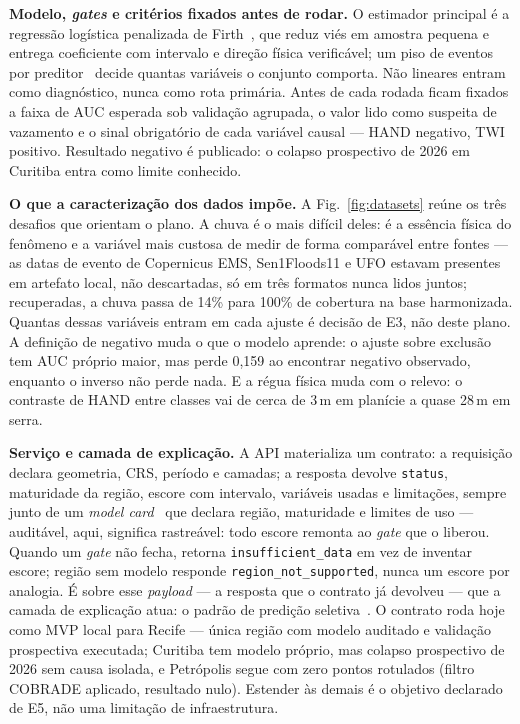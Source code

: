 \documentclass[conference]{IEEEtran}
\begin{document}
\textbf{Modelo, \emph{gates} e critérios fixados antes de rodar.} O estimador
principal é a regressão logística penalizada de Firth~\cite{firth1993}, que reduz
viés em amostra pequena e entrega coeficiente com intervalo e direção física
verificável; um piso de eventos por preditor~\cite{peduzzi1996} decide quantas
variáveis o conjunto comporta. Não lineares entram como diagnóstico, nunca como
rota primária. Antes de cada rodada ficam fixados a faixa de AUC esperada sob
validação agrupada, o valor lido como suspeita de vazamento e o sinal obrigatório
de cada variável causal --- HAND negativo, TWI positivo. Resultado negativo é
publicado: o colapso prospectivo de 2026 em Curitiba entra como limite
conhecido.

\textbf{O que a caracterização dos dados impõe.} A Fig.~\ref{fig:datasets} reúne
os três desafios que orientam o plano. A chuva é o mais difícil deles: é a
essência física do fenômeno e a variável mais custosa de medir de forma
comparável entre fontes --- as datas de evento de Copernicus EMS,
Sen1Floods11 e UFO estavam presentes em artefato local, não descartadas, só
em três formatos nunca lidos juntos; recuperadas, a chuva passa de 14\% para
100\% de cobertura na base harmonizada. Quantas dessas variáveis entram em
cada ajuste é decisão de E3, não deste plano. A definição de negativo muda o
que o modelo aprende: o
ajuste sobre exclusão tem AUC próprio maior, mas perde 0,159 ao encontrar
negativo observado, enquanto o inverso não perde nada. E a régua física muda com
o relevo: o contraste de HAND entre classes vai de cerca de 3\,m em planície a
quase 28\,m em serra.

\textbf{Serviço e camada de explicação.} A API materializa um contrato: a
requisição declara geometria, CRS, período e camadas; a resposta devolve
\texttt{status}, maturidade da região, escore com intervalo, variáveis usadas e
limitações, sempre junto de um \emph{model card}~\cite{mitchell2019} que declara
região, maturidade e limites de uso --- auditável, aqui, significa rastreável:
todo escore remonta ao \emph{gate} que o liberou. Quando um \emph{gate} não
fecha, retorna \texttt{insufficient\_data} em vez de inventar escore; região sem
modelo responde \texttt{region\_not\_supported}, nunca um escore por analogia. É
sobre esse \emph{payload} --- a resposta que o contrato já devolveu --- que a
camada de explicação atua: o padrão de predição seletiva~\cite{mitchell2019}. O contrato roda hoje como MVP
local para Recife --- única região com modelo auditado e validação
prospectiva executada; Curitiba tem modelo próprio, mas colapso prospectivo de
2026 sem causa isolada, e Petrópolis segue com zero pontos rotulados (filtro
COBRADE aplicado, resultado nulo). Estender às demais é o objetivo declarado
de E5, não uma limitação de infraestrutura.
\end{document}
